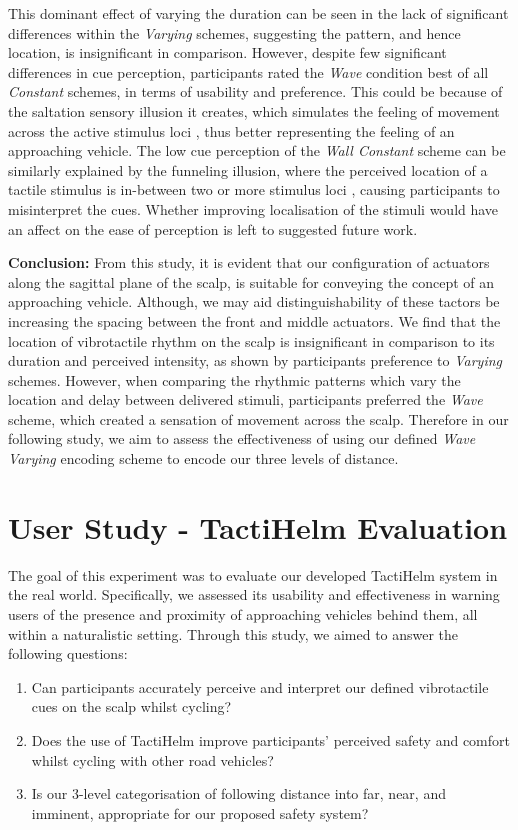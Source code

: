 \documentclass{mpaper}
\begin{document}
This dominant effect of varying the duration can be seen in the lack of significant differences within the \textit{Varying} schemes, suggesting the pattern, and hence location, is insignificant in comparison. However, despite few significant differences in cue perception, participants rated the \textit{Wave} condition best of all \textit{Constant} schemes, in terms of usability and preference. This could be because of the saltation sensory illusion it creates, which simulates the feeling of movement across the active stimulus loci \cite{cholewiak2000generation, geldard1975sensory, peeters2019vibrotactile}, thus better representing the feeling of an approaching vehicle. The low cue perception of the \textit{Wall Constant} scheme can be similarly explained by the funneling illusion, where the perceived location of a tactile stimulus is in-between two or more stimulus loci \cite{gardner1972sensory, 5710913, s150407913}, causing participants to misinterpret the cues. Whether improving localisation of the stimuli would have an affect on the ease of perception is left to suggested future work.

\textbf{Conclusion:} From this study, it is evident that our configuration of actuators along the sagittal plane of the scalp, is suitable for conveying the concept of an approaching vehicle. Although, we may aid distinguishability of these tactors be increasing the spacing between the front and middle actuators. We find that the location of vibrotactile rhythm on the scalp is insignificant in comparison to its duration and perceived intensity, as shown by participants preference to \textit{Varying} schemes. However, when comparing the rhythmic patterns which vary the location and delay between delivered stimuli, participants preferred the \textit{Wave} scheme, which created a sensation of movement across the scalp. Therefore in our following study, we aim to assess the effectiveness of using our defined \textit{Wave Varying} encoding scheme to encode our three levels of distance.


\section{User Study - TactiHelm Evaluation}\label{sec:user-study}
The goal of this experiment was to evaluate our developed TactiHelm system in the real world. Specifically, we assessed its usability and effectiveness in warning users of the presence and proximity of approaching vehicles behind them, all within a naturalistic setting. Through this study, we aimed to answer the following questions:
\begin{enumerate}[label=RQ2.\arabic*.]
    \item Can participants accurately perceive and interpret our defined vibrotactile cues on the scalp whilst cycling?
    \item Does the use of TactiHelm improve participants' perceived safety and comfort whilst cycling with other road vehicles?
    \item Is our 3-level categorisation of following distance into far, near, and imminent, appropriate for our proposed safety system?
\end{enumerate}
\end{document}
